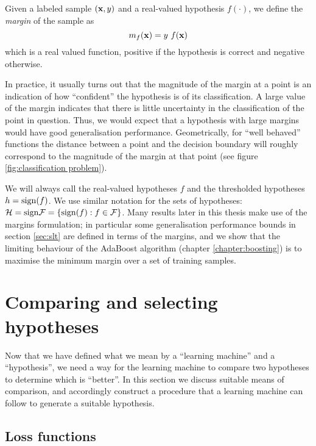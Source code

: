 \begin{definition}
Given a labeled sample $(\mathbf{x}, y)$ and a real-valued hypothesis
$f(\cdot)$, we define the \emph{margin} of the sample as
%
\begin{equation}
m_{f}(\mathbf{x}) = y\ f(\mathbf{x})
\end{equation}
%
which is a real valued function, positive if the hypothesis is correct
and negative otherwise.
\end{definition}

In practice, it usually turns out that the magnitude of the margin at
a point is an indication of how ``confident'' the hypothesis is
of its classification.  A large value of the margin indicates that
there is little uncertainty in the classification of the point in
question.  Thus, we would expect that a hypothesis with large margins
would have good generalisation performance.  Geometrically, for ``well
behaved'' functions the distance between a point and the decision
boundary will roughly correspond to the magnitude of the margin at
that point (see figure \ref{fig:classification problem}).

We will always call the real-valued hypotheses $f$ and the
thresholded hypotheses $h = \mathrm{sign}(f)$.  We use similar notation for
the sets of hypotheses: $\mathcal{H} = \mathrm{sign} \mathcal{F} = \{ \mathrm{sign}(f) : f \in
\mathcal{F} \}$.  Many results later in this thesis make use of the margins
formulation; in particular some generalisation performance bounds in
section \ref{sec:slt} are defined in terms of the margins, and we show
that the limiting behaviour of the AdaBoost algorithm (chapter
\ref{chapter:boosting}) is to maximise the minimum margin over a set of
training samples.

\section{Comparing and selecting hypotheses}
\label{sec:erm}

Now that we have defined what we mean by a ``learning machine'' and a
``hypothesis'', we need a way for the learning machine to compare two
hypotheses to determine which is ``better''.  In this section we
discuss suitable means of comparison, and accordingly construct a
procedure that a learning machine can follow to generate a suitable
hypothesis.

\subsection{Loss functions}
\label{sec:loss function}

